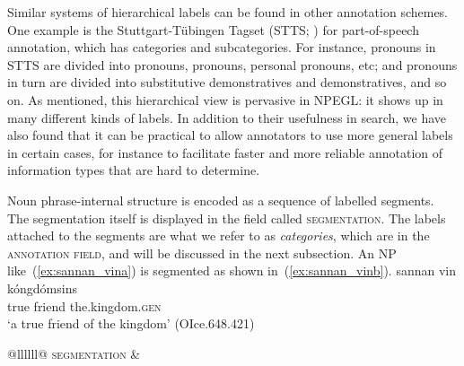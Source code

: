 \documentclass[output=paper,colorlinks,citecolor=brown]{langscibook}
\begin{document}
\begin{sloppypar}
Similar systems of hierarchical labels can be found in other annotation schemes. One example is the Stuttgart-Tübingen Tagset (STTS; \citealp{stts}) for  part-of-speech annotation, which has categories and subcategories. For instance, pronouns in STTS are divided into  pronouns,  pronouns, personal pronouns, etc; and  pronouns in turn are divided into substitutive demonstratives and  demonstratives, and so on. As mentioned, this hierarchical view is pervasive in NPEGL: it shows up in many different kinds of labels. In addition to their usefulness in search, we have also found that it can be practical to allow annotators to use more general labels in certain cases, for instance to facilitate faster and more reliable annotation of information types that are hard to determine.
\end{sloppypar}

Noun phrase-internal structure is encoded as a sequence of labelled segments. The segmentation itself is displayed in the field called \textsc{segmentation}. The labels attached to the segments are what we refer to as \textit{categories}, which are in the \textsc{annotation field}, and will be discussed in the next subsection. An NP like~(\ref{ex:sannan_vina}) is segmented as shown in~(\ref{ex:sannan_vinb}).
\ea\label{ex:sannan_vin}
    \ea \label{ex:sannan_vina} \gll sannan vin    kóngdómsins\\ %
             true   friend the.kingdom.\textsc{gen}\\
        \glt `a true friend of the kingdom' 
        (OIce.648.421)
    \ex \label{ex:sannan_vinb} %
        \begin{tabular}[t]{@{}llllll@{}}
        \textsc{segmentation} & \\
    \end{tabular}

    \z
\z
\end{document}
